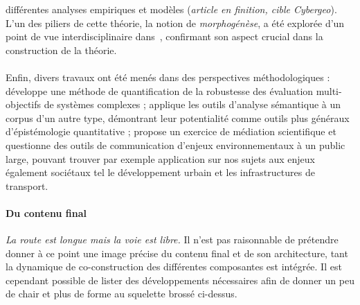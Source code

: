 différentes analyses empiriques et modèles (\textit{article en finition, cible Cybergeo}). L'un des piliers de cette théorie, la notion de \emph{morphogénèse}, a été explorée d'un point de vue interdisciplinaire dans~\cite{antelope2016interdisciplinary}, confirmant son aspect crucial dans la construction de la théorie.


\paragraph{}

Enfin, divers travaux ont été menés dans des perspectives méthodologiques : \cite{raimbault2016discrepancy} développe une méthode de quantification de la robustesse des évaluation multi-objectifs de systèmes complexes ; \cite{raimbault2016techno} applique les outils d'analyse sémantique à un corpus d'un autre type, démontrant leur potentialité comme outils plus généraux d'épistémologie quantitative ; \cite{serra2016game} propose un exercice de médiation scientifique et questionne des outils de communication d'enjeux environnementaux à un public large, pouvant trouver par exemple application sur nos sujets aux enjeux également sociétaux tel le développement urbain et les infrastructures de transport.







\paragraph{Du contenu final}


\emph{La route est longue mais la voie est libre.} Il n'est pas raisonnable de prétendre donner à ce point une image précise du contenu final et de son architecture, tant la dynamique de co-construction des différentes composantes est intégrée. Il est cependant possible de lister des développements nécessaires afin de donner un peu de chair et plus de forme au squelette brossé ci-dessus.

